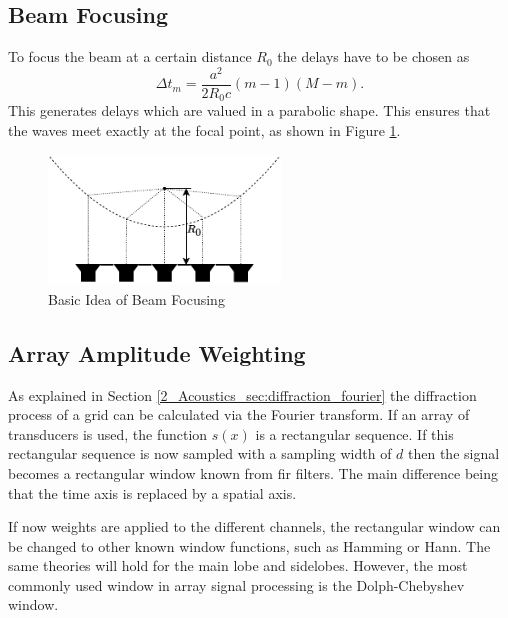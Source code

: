 \subsection{Beam Focusing}
To focus the beam at a certain distance $R_0$ the delays have to be chosen as
\begin{equation}
    \Delta t_m = \frac{a^2}{2R_0c}(m-1)(M-m).
\end{equation}
This generates delays which are valued in a parabolic shape. This ensures that the waves meet exactly at the focal point, as shown in Figure \ref{3_fig:beamfocusing}.
\begin{figure}[h!]
    \centering
    \includegraphics[width=0.55\textwidth]{images/3_Parametric_array/Beamfocusing.pdf}
    \caption{Basic Idea of Beam Focusing}
    \label{3_fig:beamfocusing}
\end{figure}

\subsection{Array Amplitude Weighting}
As explained in Section \ref{2_Acoustics_sec:diffraction_fourier} the diffraction process of a grid can be calculated via the Fourier transform. If an array of transducers is used, the function $s(x)$ is a rectangular sequence. If this rectangular sequence is now sampled with a sampling width of $d$ then the signal becomes a rectangular window known from \acrfull{fir} filters. The main difference being that the time axis is replaced by a spatial axis.

If now weights are applied to the different channels, the rectangular window can be changed to other known window functions, such as Hamming or Hann. The same theories will hold for the main lobe and sidelobes. However, the most commonly used window in array signal processing is the Dolph-Chebyshev window.  
